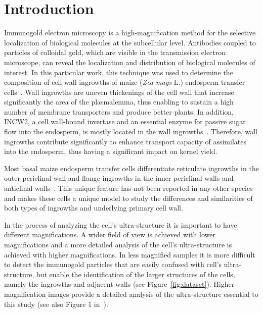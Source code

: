 \documentclass[a4paper,11pt]{article}
\newcommand{\1}{\mathbbm{1}}
\newcommand{\fref}[1]{Figure~\ref{#1}}
\theoremstyle{plain}
\begin{document}
\section{Introduction}\acresetall
Immunogold electron microscopy is a high-magnification method for the selective localization of biological molecules at the subcellular level. Antibodies coupled to particles of colloidal gold, which are visible in the transmission electron microscope, can reveal the localization and distribution of biological molecules of interest. In this particular work, this technique was used to determine the composition of cell wall ingrowths of maize (\emph{Zea mays} L.) endosperm transfer cells~\cite{monjardino2013}. Wall ingrowths are uneven thickenings of the cell wall that increase significantly the area of the plasmalemma, thus enabling to sustain a high number of membrane transporters and produce better plants. In addition, INCW2, a cell wall-bound invertase and an essential enzyme for passive sugar flow into the endosperm, is mostly located in the wall ingrowths~\cite{Kang2009}. Therefore, wall ingrowths contribute significantly to enhance transport capacity of assimilates into the endosperm, thus having a significant impact on kernel yield.

Most basal maize endosperm transfer cells differentiate reticulate ingrowths in the outer periclinal wall and flange ingrowths in the inner periclinal walls and anticlinal walls~\cite{monjardino2013}. This unique feature has not been reported in any other species and makes these cells a unique model to study the differences and similarities of both types of ingrowths and underlying primary cell wall.

In the process of analyzing the cell’s ultra-structure it is important to have different magnifications. A wider field of view is achieved with lower magnifications and a more detailed analysis of the cell’s ultra-structure is achieved with higher magnifications. In less magnified samples it is more difficult to detect the immunogold particles that are easily confused with cell’s ultra-structure, but enable the identification of the larger structures of the cells, namely the ingrowths and adjacent walls (see \fref{fig:dataset}). Higher magnification images provide a detailed analysis of the ultra-structure essential to this study (see also Figure 1 in~\cite{RGamelasSousaIWANN2015}).
\end{document}
